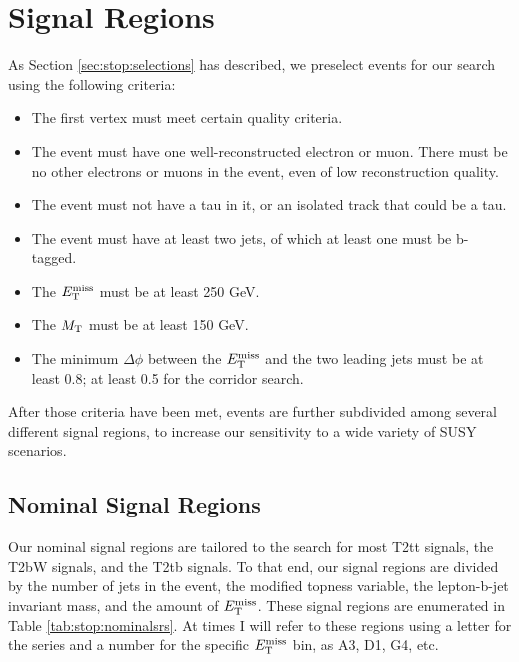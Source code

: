 \section{Signal Regions}
\label{sec:stop:sigregs}

As Section \ref{sec:stop:selections} has described, we preselect events
for our search using the following criteria:
\begin{itemize}
\item The first vertex must meet certain quality criteria.
\item The event must have one well-reconstructed electron or
  muon. There must be no other electrons or muons in the event, even
  of low reconstruction quality.
\item The event must not have a tau in it, or an isolated track that
  could be a tau.
\item The event must have at least two jets, of which at least one
  must be b-tagged.
\item The $E_\text{T}^\text{miss}$ must be at least 250 GeV.
\item The $M_\text{T}$ must be at least 150 GeV.
\item The minimum $\Delta \phi$ between the $E_\text{T}^\text{miss}$ and the two leading
  jets must be at least 0.8; at least 0.5 for the corridor search.
\end{itemize}
After those criteria have been met, events are further subdivided
among several different signal regions, to increase our sensitivity to
a wide variety of SUSY scenarios.

\subsection{Nominal Signal Regions}
\label{ssec:stop:sigregsnominal}

Our nominal signal regions are tailored to the search for most T2tt
signals, the T2bW signals, and the T2tb signals. To that end, our
signal regions are divided by the number of jets in the event, the
modified topness variable, the lepton-b-jet invariant mass, and the
amount of $E_\text{T}^\text{miss}$. These signal regions are enumerated in Table
\ref{tab:stop:nominalsrs}. At times I will refer to these regions using a
letter for the series and a number for the specific $E_\text{T}^\text{miss}$ bin, as
A3, D1, G4, etc.

